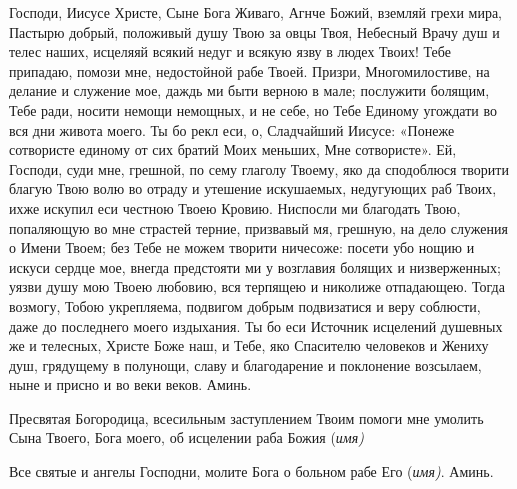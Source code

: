 \begin{mymulticols}
 


Господи, Иисусе Христе, Сыне Бога Живаго, Агнче Божий, вземляй грехи мира, Пастырю добрый, положивый душу Твою за овцы Твоя, Небесный Врачу душ и телес наших, исцеляяй всякий недуг и всякую язву в людех Твоих! Тебе припадаю, помози мне, недостойной рабе Твоей. Призри, Многомилостиве, на делание и служение мое, даждь ми быти верною в мале; послужити болящим, Тебе ради, носити немощи немощных, и не себе, но Тебе Единому угождати во вся дни живота моего. Ты бо рекл еси, о, Сладчайший Иисусе: «Понеже сотвористе единому от сих братий Моих меньших, Мне сотвористе». Ей, Господи, суди мне, грешной, по сему глаголу Твоему, яко да сподоблюся творити благую Твою волю во отраду и утешение искушаемых, недугующих раб Твоих, ихже искупил еси честною Твоею Кровию. Ниспосли ми благодать Твою, попаляющую во мне страстей терние, призвавый мя, грешную, на дело служения о Имени Твоем; без Тебе не можем творити ничесоже: посети убо нощию и искуси сердце мое, внегда предстояти ми у возглавия болящих и низверженных; уязви душу мою Твоею любовию, вся терпящею и николиже отпадающею. Тогда возмогу, Тобою укрепляема, подвигом добрым подвизатися и веру соблюсти, даже до последнего моего издыхания. Ты бо еси Источник исцелений душевных же и телесных, Христе Боже наш, и Тебе, яко Спасителю человеков и Жениху душ, грядущему в полунощи, славу и благодарение и поклонение возсылаем, ныне и присно и во веки веков. Аминь. 




\end{mymulticols}

\mychapterending


 


Пресвятая Богородица, всесильным заступлением Твоим помоги мне умолить Сына Твоего, Бога моего, об исцелении раба Божия {(\itshape имя)}


\mychapterending


 


Все святые и ангелы Господни, молите Бога о больном рабе Его {(\itshape имя)}. Аминь.


\mychapterending


